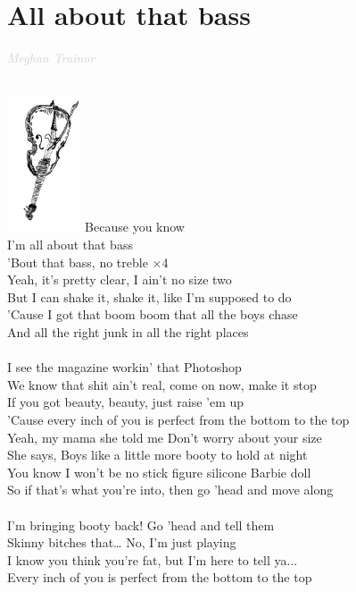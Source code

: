 \documentclass[a5paper, 10pt]{book}
\begin{document}
\section{All about that bass}\textcolor{lightgray}{\textit{Meghan Trainor}}\\
\begin{minipage}[t]{0.8\textwidth}
~\\ \includegraphics[height=4cm, angle=180, right]{images/all_about_that_bass_1.png}\vspace*{-4.3cm}
\hspace*{5mm}Because you know\\
\hspace*{5mm}I'm all about that bass\\
\hspace*{5mm}'Bout that bass, no treble \hspace*{15mm}$\times$4\\

Yeah, it's pretty clear, I ain't no size two\\
But I can shake it, shake it, like I'm supposed to do\\
'Cause I got that boom boom that all the boys chase\\
And all the right junk in all the right places\\
\\
I see the magazine workin' that Photoshop\\
We know that shit ain't real, come on now, make it stop\\
If you got beauty, beauty, just raise 'em up\\
'Cause every inch of you is perfect from the bottom to the top\\

\hspace*{3mm}Yeah, my mama she told me Don't worry about your size\\
\hspace*{3mm}She says, Boys like a little more booty to hold at night\\
\hspace*{3mm}You know I won't be no stick figure silicone Barbie doll\\
\hspace*{3mm}So if that's what you're into, then go 'head and move along\\
\\
I'm bringing booty back! Go 'head and tell them\\
Skinny bitches that… No, I'm just playing\\
I know you think you're fat, but I'm here to tell ya...\\
Every inch of you is perfect from the bottom to the top\\
\end{minipage}
\end{document}
